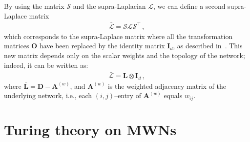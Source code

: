 \documentclass[aps,showpacs,preprintnumbers,amsmath,amssymb,twocolumn,superscriptaddress,floatfix,nofootinbib,10pt,pre]{revtex4-1}
\begin{document}
By using the matrix $\mathcal{S}$ and the supra-Laplacian $\mathcal{L}$, we can define a second supra-Laplace matrix 
\begin{align}
\bar{\mathcal{L}} = \mathcal{S}\mathcal{L}\mathcal{S}^\top\, ,
\end{align}
which corresponds to the supra-Laplace matrix where all the transformation matrices $\mathbf{O}$ 
have been replaced by the identity matrix $\mathbf{I}_d$, as described in~\cite{tian2025matrix}. This new matrix depends only on the scalar weights and the topology of the network; indeed, it can be written as:
\begin{align}
    \label{eq:Lbar}
    \bar{\mathcal{L}}=\bar{\mathbf{L}}\otimes \mathbf{I}_d\, ,
\end{align}
where $\bar{\mathbf{L}}=\mathbf{D}-\mathbf{A}^{(w)}$, and $\mathbf{A}^{(w)}$ is the weighted adjacency matrix of the underlying network, i.e., each $(i,j)$--entry of $\mathbf{A}^{(w)}$ equals $w_{ij}$.


\section{Turing theory on MWN\MakeLowercase{s}}
\label{sec:TTMWN}
\end{document}
